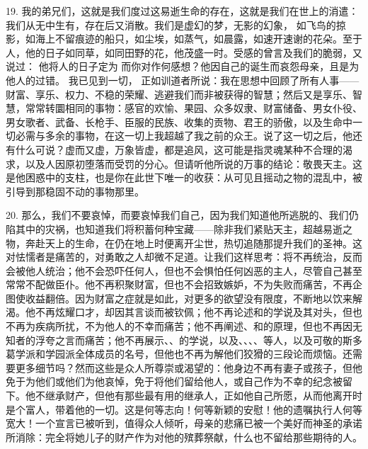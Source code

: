 19. 我的弟兄们，这就是我们度过这易逝生命的存在，这就是我们在世上的消遣：我们从无中生有，存在后又消散。我们是虚幻的梦，无影的幻象， 如飞鸟的掠影，如海上不留痕迹的船只，如尘埃，如蒸气，如晨露，如速开速谢的花朵。至于人，他的日子如同草，如同田野的花，他茂盛一时。受感的曾言及我们的脆弱，又说过： 他将人的日子定为 而你对作何感想？他因自己的诞生而哀怨母亲，且是为他人的过错。 我已见到一切， 正如训道者所说：我在思想中回顾了所有人事——财富、享乐、权力、不稳的荣耀、逃避我们而非被获得的智慧；然后又是享乐、智慧，常常转圜相同的事物：感官的欢愉、果园、众多奴隶、财富储备、男女仆役、男女歌者、武备、长枪手、臣服的民族、收集的贡物、君王的骄傲，以及生命中一切必需与多余的事物，在这一切上我超越了我之前的众王。说了这一切之后，他还有什么可说？虚而又虚，万象皆虚，都是追风，这可能是指灵魂某种不合理的渴求，以及人因原初堕落而受罚的分心。但请听他所说的万事的结论：敬畏天主。这是他困惑中的支柱，也是你在此世下唯一的收获：从可见且摇动之物的混乱中，被引导到那稳固不动的事物那里。 \par

20. 那么，我们不要哀悼，而要哀悼我们自己，因为我们知道他所逃脱的、我们仍陷其中的灾祸，也知道我们将积蓄何种宝藏——除非我们紧贴天主，超越易逝之物，奔赴天上的生命，在仍在地上时便离开尘世，热切追随那提升我们的圣神。这对怯懦者是痛苦的，对勇敢之人却微不足道。让我们这样思考：将不再统治，反而会被他人统治；他不会恐吓任何人，但也不会惧怕任何凶恶的主人，尽管自己甚至常常不配做臣仆。他不再积聚财富，但也不会招致嫉妒，不为失败而痛苦，不再企图使收益翻倍。因为财富之症就是如此，对更多的欲望没有限度，不断地以饮来解渴。他不再炫耀口才，却因其言谈而被钦佩；他不再论述和的学说及其对头，但也不再为疾病所扰，不为他人的不幸而痛苦；他不再阐述、和的原理，但也不再因无知者的浮夸之言而痛苦；他不再展示、、的学说，以及、、、、等人，以及可敬的斯多葛学派和学园派全体成员的名号，但他也不再为解他们狡猾的三段论而烦恼。还需要更多细节吗？然而这些是众人所尊崇或渴望的：他身边不再有妻子或孩子，但他免于为他们或他们为他哀悼，免于将他们留给他人，或自己作为不幸的纪念被留下。他不继承财产，但他有那些最有用的继承人，正如他自己所愿，从而他离开时是个富人，带着他的一切。这是何等志向！何等新颖的安慰！他的遗嘱执行人何等宽大！一个宣言已被听到，值得众人倾听，母亲的悲痛已被一个美好而神圣的承诺所消除：完全将她儿子的财产作为对他的殡葬祭献，什么也不留给那些期待的人。\par

